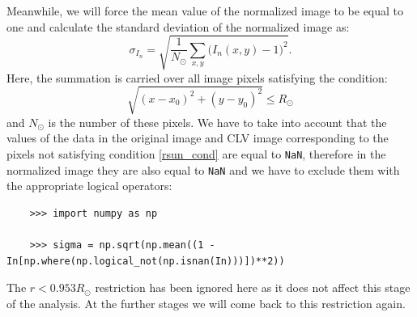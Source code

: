 \documentclass[paper=a4, fontsize=11pt]{article}
\numberwithin{equation}{section}
\numberwithin{figure}{section}
\numberwithin{table}{section}
\begin{document}
Meanwhile, we will force the mean value of the normalized image to be equal to one and calculate the standard deviation of the
normalized image as:
\begin{equation}\label{eq:sigma_I}
\sigma_{I_n} = \sqrt{\frac{1}{N_\odot}\sum\limits_{x, y}\big(I_n(x, y) - 1\big)^2}.
\end{equation}
Here, the summation is carried over all image pixels satisfying the condition:
\begin{equation}\label{rsun_cond}
\sqrt{(x - x_0)^2 + (y - y_0)^2} \le R_\odot
\end{equation}
and $N_\odot$ is the number of these pixels.
We have to take into account that the values of the data
in the original image and CLV image corresponding to the pixels not satisfying condition \eqref{rsun_cond}
are equal to \texttt{NaN}, therefore in the normalized image they are also equal to \texttt{NaN}
and we have to exclude them with the appropriate logical operators:
\begin{verbatim}
    >>> import numpy as np

    >>> sigma = np.sqrt(np.mean((1 - In[np.where(np.logical_not(np.isnan(In)))])**2))
\end{verbatim}
The $r < 0.953R_\odot$ restriction has been ignored here as it does not affect this stage of the analysis.
At the further stages we will come back to this restriction again.
\end{document}
